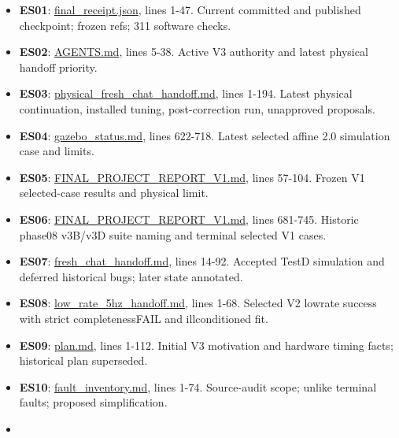 \documentclass[
  10pt,
  letterpaper,
]{article}
\begin{document}
\begin{itemize}
\item
  \textbf{ES01}:
  \href{/home/mattb/Experiments/GESC-Gaussian/v3/git_closeout_20261002T041241Z/final_receipt.json:1}{final\_receipt.json},
  lines 1-47. Current committed and published checkpoint; frozen refs;
  311 software checks.
\item
  \textbf{ES02}: \href{/home/mattb/dsim-lab/AGENTS.md:5}{AGENTS.md},
  lines 5-38. Active V3 authority and latest physical handoff priority.
\item
  \textbf{ES03}:
  \href{/home/mattb/dsim-lab/docs/codex/gesc_gaussian/v3/physical_fresh_chat_handoff.md:1}{physical\_fresh\_chat\_handoff.md},
  lines 1-194. Latest physical continuation, installed tuning,
  post-correction run, unapproved proposals.
\item
  \textbf{ES04}:
  \href{/home/mattb/dsim-lab/docs/codex/gesc_gaussian/v3/gazebo_status.md:622}{gazebo\_status.md},
  lines 622-718. Latest selected affine 2.0 simulation case and limits.
\item
  \textbf{ES05}:
  \href{/home/mattb/dsim-lab/docs/codex/gesc_gaussian/FINAL_PROJECT_REPORT_V1.md:57}{FINAL\_PROJECT\_REPORT\_V1.md},
  lines 57-104. Frozen V1 selected-case results and physical limit.
\item
  \textbf{ES06}:
  \href{/home/mattb/dsim-lab/docs/codex/gesc_gaussian/FINAL_PROJECT_REPORT_V1.md:681}{FINAL\_PROJECT\_REPORT\_V1.md},
  lines 681-745. Historic phase08 v3B/v3D suite naming and terminal
  selected V1 cases.
\item
  \textbf{ES07}:
  \href{/home/mattb/dsim-lab/docs/codex/gesc_gaussian/v2/fresh_chat_handoff.md:14}{fresh\_chat\_handoff.md},
  lines 14-92. Accepted TestD simulation and deferred historical bugs;
  later state annotated.
\item
  \textbf{ES08}:
  \href{/home/mattb/dsim-lab/docs/codex/gesc_gaussian/v2/low_rate_5hz_handoff.md:1}{low\_rate\_5hz\_handoff.md},
  lines 1-68. Selected V2 lowrate success with strict completenessFAIL
  and illconditioned fit.
\item
  \textbf{ES09}:
  \href{/home/mattb/dsim-lab/docs/codex/gesc_gaussian/v3/plan.md:1}{plan.md},
  lines 1-112. Initial V3 motivation and hardware timing facts;
  historical plan superseded.
\item
  \textbf{ES10}:
  \href{/home/mattb/dsim-lab/docs/codex/gesc_gaussian/v3/fault_inventory.md:1}{fault\_inventory.md},
  lines 1-74. Source-audit scope; unlike terminal faults; proposed
  simplification.
\item

\end{itemize}
\end{document}

